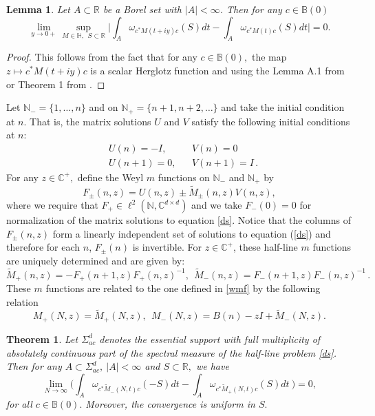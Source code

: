 \documentclass[reqno]{amsart}
\numberwithin{equation}{section}
\newcommand{\C}{\mathbb{C}}
\newcommand{\R}{\mathbb{R}}
\newcommand{\N}{\mathbb{N}}
\newtheorem{theorem}{Theorem}[section]
\newtheorem{lemma}{Lemma}[section]
\begin{document}
\begin{lemma} \label{lemma 4.6} Let $A \subset \R$ be a Borel set with $|A| < \infty $. Then  for any $c\in \mathbb B(0)$ 
$$ \lim_{y\rightarrow 0+} \sup_{M\in \mathbb H, \ \ S \subset \R} \Big| \int_A \omega_{c^*M(t+iy)c}(S) dt  - \int_A \omega_{c^*M(t)c}(S) dt \Big| = 0 .$$\end{lemma}
\begin{proof} This follows from the fact that for any $c\in \mathbb B(0), $ 
 the map $ z\mapsto c^*M(t+iy)c$ is a scalar Herglotz function and using the Lemma A.1 from \cite{CR1} or Theorem 1 from \cite{BP2}.\end{proof}
 Let $ \N_- = \{1,\ldots , n\}$ and  on $\N_+ =\{ n+1, n+2,\ldots\}$ and  take the initial condition at $n$. That is, the matrix solutions $U$ and $V$ satisfy the following initial conditions at $n$: 	 
\begin{equation*}
	\begin{aligned}
		&U(n)  =  - I, && V(n) = 0 \\ 
		&U(n+1)= 0,  && V(n+1) = I\,.
	\end{aligned}
\end{equation*}
For any $z\in \C^+, $ define the Weyl $m$ functions on $\N_-$ and $\N_+$ by	
\begin{equation}\label{ss}
	F_{\pm}(n,z) = U(n,z) \pm  \tilde M_{\pm}(n,z) V(n,z),
\end{equation}
where we require that $F_+\in\ell^2(\N,\C^{d \times d})$ and we take $F_-(0) = 0$ for normalization of the matrix  solutions to equation \eqref{ds}. Notice that the columns of $F_{\pm}(n,z)$ form a linearly independent set of solutions to equation (\ref{ds}) and therefore for each $n$, $F_{\pm}(n)$ is invertible.  For $z\in\C^+$, these half-line $m$ functions are uniquely determined and are given by:
\begin{equation} \label{mf}
	\tilde M_+(n,z) = - F_+(n+1,z)F_+(n,z)^{-1},\ \  \tilde M_-(n,z)  =  F_-(n+1,z)F_-(n,z)^{-1}\,.
\end{equation}
These $m$ functions are related to the one defined in \eqref{wmf}  by the following relation $$M_+(N,z) = \tilde M_+(N,z), \ \ M_{-}(N,z) = B(n) -zI + \tilde  M_{-}(N,z) .$$ 

\begin{theorem} \label{theorem 4.8}  Let $\Sigma_{ac}^d$ denotes the essential support with full multiplicity of absolutely continuous part of the spectral measure of the half-line problem \eqref{ds}. Then for any $A \subset \Sigma_{ac}^d, \ |A| < \infty $ and $S \subset \R,$ we have 
\begin{equation*}
\lim_{N\rightarrow \infty}\Big ( \int_A \omega_{c^* \tilde M_-(N,t)c} (-S) dt -\int_A \omega_{c^* \tilde M_+(N,t)c}(S) dt\ \Big ) = 0,
\end{equation*} 
for all $c\in \mathbb B(0).$ Moreover, the convergence is uniform in $S .$\end{theorem}
\end{document}
